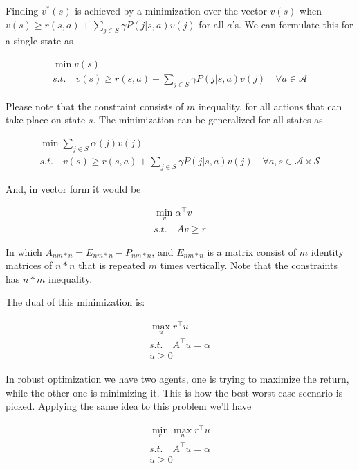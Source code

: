 \documentclass{article}
\theoremstyle{remark}
\theoremstyle{remark}
\theoremstyle{remark}
\theoremstyle{remark}
\theoremstyle{remark}
\theoremstyle{remark}
\begin{document}
Finding $v^*(s)$ is achieved by a minimization over the vector $v(s)$ when $v(s) \geq r(s,a)+\sum_{j \in S}\gamma P(j|s,a) v(j)$ for all $a$'s. We can formulate this for a single state as

$$
    \begin{matrix}
    \min v(s) \\
    s.t. \quad v(s) \geq r(s,a)+\sum_{j \in S}\gamma P(j|s,a) v(j) \quad \forall a \in \mathcal{A}
    \end{matrix}
$$

Please note that the constraint consists of $m$ inequality, for all actions that can take place on state $s$. The minimization can be generalized for all states as

$$
\begin{matrix}

    \min \sum_{j \in S} \alpha(j)v(j) \quad \\
    s.t. \quad v(s) \geq r(s,a)+\sum_{j \in S}\gamma P(j|s,a) v(j) \quad \forall a,s \in \mathcal{A \times S} 
\end{matrix}
$$

And, in vector form it would be

$$
  \begin{matrix}
  
    \min_v \alpha^\top  v \\
    s.t. \quad A v \geq r
  \end{matrix}
$$

In which $A_{nm*n} = E_{nm*n} - P_{nm*n}$, and $E_{nm*n}$ is a matrix consist of $m$ identity matrices of $n*n$ that is repeated $m$ times vertically. Note that the constraints has $n*m$ inequality.

The dual of this minimization is:

$$
  \begin{matrix}
  
    \max_u r^\top  u \\
    s.t. \quad A^\top  u = \alpha \\
    u \geq 0
  \end{matrix}
$$

In robust optimization we have two agents, one is trying to maximize the return, while the other one is minimizing it. This is how the best worst case scenario is picked. Applying the same idea to this problem we'll have

$$
  \begin{matrix}
  
    \min_r \max_u r^\top  u \\
    s.t. \quad A^\top  u = \alpha \\
    u \geq 0
  \end{matrix}
$$
\end{document}
